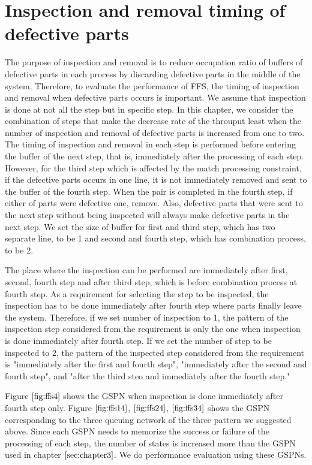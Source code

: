 
\section{Inspection and removal timing of defective parts \label{sec:rule}}
The purpose of inspection and removal is to reduce occupation ratio of buffers of defective parts in each process by discarding defective parts in the middle of the system.
Therefore, to evaluate the performance of FFS, the timing of inspection and removal when defective parts occurs is important.
We assume that inspection is done at not all the step but in specific step.
In this chapter, we consider the combination of steps that make the decrease rate of the throuput least when the number of inspection and removal of defective parts is increased from one to two.
The timing of inspection and removal in each step is performed before entering the buffer of the next step, that is, immediately after the processing of each step.
However, for the third step which is affected by the match processing constraint, if the defective parts occurs in one line, it is not immediately removed and sent to the buffer of the fourth step. When the pair is completed in the fourth step, if either of parts were defective one, remove.
Also, defective parts that were sent to the next step without being inspected will always make defective parts in the next step.
We set the size of buffer for first and third step, which has two separate line, to be 1 and second and fourth step, which has combination process, to be 2.

The place where the inspection can be performed are immediately after first, second, fourth step and after third step, which is before combination process at fourth step.
As a requirement for selecting the step to be inspected, the inspection has to be done immediately after fourth step where parts finally leave the system.
Therefore, if we set number of inspection to 1, the pattern of the inspection step considered from the requirement is only the one when inspection is done immediately after fourth step.
If we set the number of step to be inspected to 2, the pattern of the inspected step considered from the requirement is "immediately after the first and fourth step", "immediately after the second and fourth step", and "after the third steo and immediately after the fourth step."

Figure $\ref{fig:ffs4}$ shows the GSPN when inspection is done immediately after fourth step only.
Figure $\ref{fig:ffs14}$, $\ref{fig:ffs24}$, $\ref{fig:ffs34}$ shows the GSPN corresponding to the three queuing network of the three pattern we suggested above.
Since each GSPN needs to memorize the success or failure of the processing of each step, the number of states is increased more than the GSPN used in chapter $\ref{sec:chapter3}$.
We do performance evaluation using these GSPNs.


